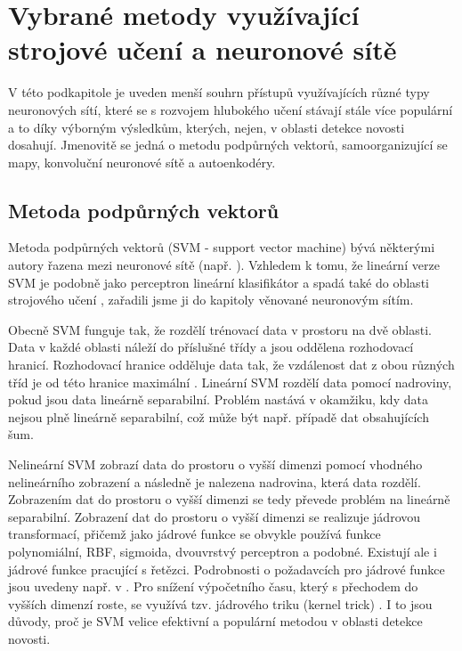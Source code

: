 \section{Vybrané metody využívající strojové učení a neuronové sítě}\label{chap:nn_reserse}
V této podkapitole je uveden menší souhrn přístupů  využívajících různé typy neuronových sítí, které se s rozvojem hlubokého učení stávají stále více populární a to díky výborným výsledkům, kterých, nejen, v oblasti detekce novosti dosahují. Jmenovitě se jedná o metodu podpůrných vektorů, samoorganizující se mapy, konvoluční neuronové sítě a autoenkodéry.
\subsection{Metoda podpůrných vektorů}
Metoda podpůrných vektorů (SVM - support vector machine) bývá některými autory řazena mezi neuronové sítě (např. \cite{markou2}). Vzhledem k tomu, že lineární verze SVM \cite{svm1} je podobně jako perceptron \cite{perceptron} lineární klasifikátor a spadá také do oblasti strojového učení \cite{ml1,ml2}, zařadili jsme ji do kapitoly věnované neuronovým sítím.
\par 
Obecně SVM funguje tak, že rozdělí trénovací data v prostoru na dvě oblasti. Data v každé oblasti náleží do příslušné třídy a jsou oddělena rozhodovací hranicí. Rozhodovací hranice odděluje data tak, že vzdálenost dat z obou různých tříd je od této hranice maximální \cite{svm3}. Lineární SVM rozdělí data pomocí nadroviny, pokud jsou data lineárně separabilní. Problém nastává v okamžiku, kdy data nejsou plně lineárně separabilní, což může být např.  případě dat obsahujících šum.
\par 
Nelineární SVM \cite{svm1} zobrazí data do prostoru o vyšší dimenzi pomocí vhodného nelineárního zobrazení a následně je nalezena nadrovina, která data rozdělí. Zobrazením dat do prostoru o vyšší dimenzi se tedy převede problém na lineárně separabilní. Zobrazení dat do prostoru o vyšší dimenzi se realizuje jádrovou transformací, přičemž jako jádrové funkce se obvykle používá funkce polynomiální, RBF, sigmoida, dvouvrstvý perceptron a podobné. Existují ale i jádrové funkce pracující s řetězci. Podrobnosti o požadavcích pro jádrové funkce jsou uvedeny např. v \cite{svm4}. Pro snížení výpočetního času, který s přechodem do vyšších dimenzí roste, se využívá tzv. jádrového triku (kernel trick) \cite{kernel}. I to jsou důvody, proč je SVM velice efektivní a populární metodou v oblasti detekce novosti.
\par 

